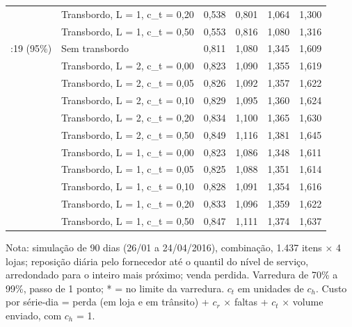 \begin{table}[htbp]
\begin{tabular}{llrrrr}
 & Transbordo, L = 1, c\_t = 0,20 & 0,538 & 0,801 & 1,064 & 1,300 \\
 & Transbordo, L = 1, c\_t = 0,50 & 0,553 & 0,816 & 1,080 & 1,316 \\
\addlinespace
1:19 (95\%) & Sem transbordo & 0,811 & 1,080 & 1,345 & 1,609 \\
 & Transbordo, L = 2, c\_t = 0,00 & 0,823 & 1,090 & 1,355 & 1,619 \\
 & Transbordo, L = 2, c\_t = 0,05 & 0,826 & 1,092 & 1,357 & 1,622 \\
 & Transbordo, L = 2, c\_t = 0,10 & 0,829 & 1,095 & 1,360 & 1,624 \\
 & Transbordo, L = 2, c\_t = 0,20 & 0,834 & 1,100 & 1,365 & 1,630 \\
 & Transbordo, L = 2, c\_t = 0,50 & 0,849 & 1,116 & 1,381 & 1,645 \\
 & Transbordo, L = 1, c\_t = 0,00 & 0,823 & 1,086 & 1,348 & 1,611 \\
 & Transbordo, L = 1, c\_t = 0,05 & 0,825 & 1,088 & 1,351 & 1,614 \\
 & Transbordo, L = 1, c\_t = 0,10 & 0,828 & 1,091 & 1,354 & 1,616 \\
 & Transbordo, L = 1, c\_t = 0,20 & 0,833 & 1,096 & 1,359 & 1,622 \\
 & Transbordo, L = 1, c\_t = 0,50 & 0,847 & 1,111 & 1,374 & 1,637 \\
\bottomrule
\end{tabular}
\par\smallskip
{\footnotesize Nota: simulação de 90 dias (26/01 a 24/04/2016), combinação, 1.437 itens × 4 lojas; reposição diária pelo fornecedor até o quantil do nível de serviço, arredondado para o inteiro mais próximo; venda perdida. Varredura de 70\% a 99\%, passo de 1 ponto; * = no limite da varredura. $c_t$ em unidades de $c_h$. Custo por série-dia = perda (em loja e em trânsito) + $c_r$ × faltas + $c_t$ × volume enviado, com $c_h$ = 1.}
\end{table}
